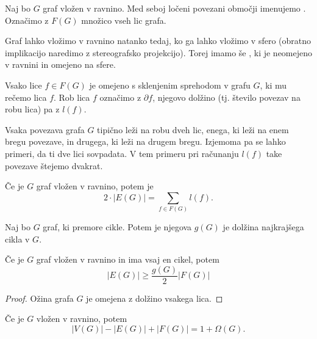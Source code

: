 \begin{definicija}
    Naj bo $G$ graf vložen v ravnino. Med seboj ločeni povezani območji imenujemo . Označimo z $F(G)$ množico vseh lic grafa.
\end{definicija}

\begin{opomba}
    Graf lahko vložimo v ravnino natanko tedaj, ko ga lahko vložimo v sfero (obratno implikacijo naredimo z stereografsko projekcijo). Torej imamo še , ki je neomejeno v ravnini in omejeno na sfere.
\end{opomba}

\begin{definicija}
    Vsako lice $f \in F(G)$ je omejeno s sklenjenim sprehodom v grafu $G$, ki mu rečemo  lica $f$. Rob lica $f$ označimo z $\partial f$, njegovo dolžino (tj. število povezav na robu lica) pa z $l(f)$.
\end{definicija}

\begin{opomba}
    Vsaka povezava grafa $G$ tipično leži na robu dveh lic, enega, ki leži na enem bregu povezave, in drugega, ki leži na drugem bregu. Izjemoma pa se lahko primeri, da ti dve lici sovpadata. V tem primeru pri računanju $l(f)$ take povezave štejemo dvakrat.
\end{opomba}

\begin{trditev}
    Če je $G$ graf vložen v ravnino, potem je $$2 \cdot |E(G)| = \sum_{f \in F(G)} l(f).$$
\end{trditev}

\newpage
\begin{definicija}
    Naj bo $G$ graf, ki premore cikle. Potem je njegova  $g(G)$ je dolžina najkrajšega cikla v $G$.
\end{definicija}

\begin{trditev}
    Če je $G$ graf vložen v ravnino in ima vsaj en cikel, potem 
    $$|E(G)| \geq \frac{g(G)}{2}|F(G)|$$
\end{trditev}

\begin{proof}
    Ožina grafa $G$ je omejena z dolžino vsakega lica.
\end{proof}

\begin{izrek}
    Če je $G$ vložen v ravnino, potem $$|V(G)| - |E(G)|+|F(G)| = 1 + \Omega (G).$$
\end{izrek}

